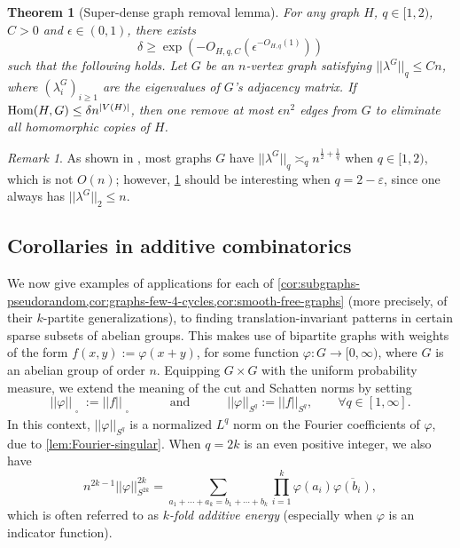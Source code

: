 \documentclass[reqno,11pt]{amsart}
\newtheorem{theorem}{Theorem}[section]
\theoremstyle{definition}
\theoremstyle{remark}
\newtheorem*{remark}{Remark}
\numberwithin{equation}{section}
\newcommand{\eps}{\varepsilon}
\renewcommand{\bar}{\overline}
\newcommand{\sq}{_{\substack{ \\ \square}}}
\newcommand{\Hom}{\textnormal{Hom}}
\begin{document}

\begin{theorem}[Super-dense graph removal lemma] \label{thm:super-dense-removal}
For any graph $H$, $q \in [1, 2)$, $C > 0$ and $\epsilon \in (0, 1)$, there exists 
\[
    \delta \ge \exp \left(- O_{H,q,C}\left(\epsilon^{-O_{H,q}(1)} \right) \right)
\]
such that the following holds. Let $G$ be an $n$-vertex graph satisfying $||\lambda^G||_q \le C n$, where $(\lambda^G_i)_{i \ge 1}$ are the eigenvalues of $G$'s adjacency matrix. 
If $\Hom(H, G) \le \delta n^{|V(H)|}$, then one remove at most $\epsilon n^2$ edges from $G$ to eliminate all homomorphic copies of $H$.
\end{theorem}

\begin{remark}
As shown in \cite{nikiforov2012extremal}, most graphs $G$ have $||\lambda^G||_q \asymp_q n^{\frac{1}{2} + \frac{1}{q}}$ when $q \in [1, 2)$, which is not $O(n)$; however, \cref{thm:super-dense-removal} should be interesting when $q = 2 - \eps$, since one always has $||\lambda^G||_2 \le n$. 
\end{remark}




\subsection{Corollaries in additive combinatorics}

We now give examples of applications for each of \cref{cor:subgraphs-pseudorandom,cor:graphs-few-4-cycles,cor:smooth-free-graphs} (more precisely, of their $k$-partite generalizations), to finding translation-invariant patterns in certain sparse subsets of abelian groups. This makes use of bipartite graphs with weights of the form $f(x, y) := \varphi(x+y)$, for some function $\varphi : G \to [0, \infty)$, where $G$ is an abelian group of order $n$. Equipping $G \times G$ with the uniform probability measure, we extend the meaning of the cut and Schatten norms by setting
\[
    ||\varphi||\sq := ||f||\sq \qquad\quad \text{and} \qquad\quad 
    ||\varphi||_{S^q} := ||f||_{S^q},
    \qquad 
    \forall q \in [1, \infty].
\]
In this context, $||\varphi||_{S^q}$ is a normalized $L^q$ norm on the Fourier coefficients of $\varphi$, due to \cref{lem:Fourier-singular}. When $q = 2k$ is an even positive integer, we also have 
\[
    n^{2k-1} ||\varphi||_{S^{2k}}^{2k} = \sum_{a_1+\cdots+a_k = b_1+\cdots+b_k} \prod_{i=1}^k \varphi(a_i) \bar{\varphi(b_i)},
\]
which is often referred to as \emph{$k$-fold additive energy} (especially when $\varphi$ is an indicator function).
\end{document}
